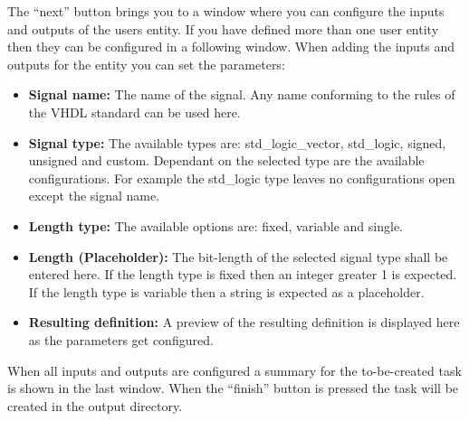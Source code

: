 The ``next'' button brings you to a window where you can configure the inputs and outputs of the users entity. If you have defined more than one user entity then they can be configured in a following window. When adding the inputs and outputs for the entity you can set the parameters:

\begin{itemize}
\item {\bf Signal name:} The name of the signal. Any name conforming to the rules of the VHDL standard can be used here.
\item {\bf Signal type:} The available types are: std\_logic\_vector, std\_logic, signed, unsigned and custom. Dependant on the selected type are the available configurations. For example the std\_logic type leaves no configurations open except the signal name.
\item {\bf Length type:} The available options are: fixed, variable and single.
\item {\bf Length (Placeholder):} The bit-length of the selected signal type shall be entered here. If the length type is fixed then an integer greater 1 is expected. If the length type is variable then a string is expected as a placeholder.
\item {\bf Resulting definition:} A preview of the resulting definition is displayed here as the parameters get configured.
\end{itemize}

When all inputs and outputs are configured a summary for the to-be-created task is shown in the last window. When the ``finish'' button is pressed the task will be created in the output directory.

